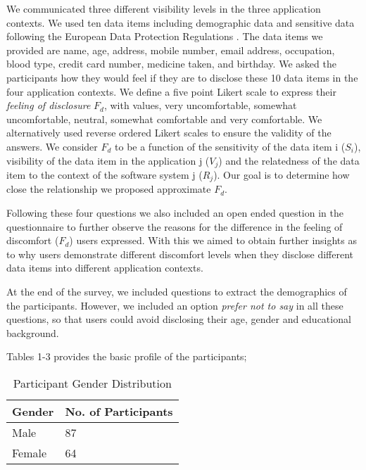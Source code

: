 \documentclass[10pt]{article}
\begin{document}
We communicated three different visibility levels in the three application contexts. We used ten data items including demographic data and sensitive data following the European Data Protection Regulations \cite {wagner2016national}. The data items we provided are name, age, address, mobile number, email address, occupation, blood type, credit card number, medicine taken, and birthday. We asked the participants how they would feel if they are to disclose these 10 data items in the four application contexts. We define a five point Likert scale to express their \textit{feeling of disclosure} $F_d$, with values, very uncomfortable, somewhat uncomfortable, neutral, somewhat comfortable and very comfortable. We alternatively used reverse ordered Likert scales to ensure the validity of the answers. We consider $F_d$ to be a function of the sensitivity of the data item i ($S_i$), visibility of the data item in the application j ($V_j$) and the relatedness of the data item to the context of the software system j ($R_j$). Our goal is to determine how close the relationship we proposed approximate $F_d$.

Following these four questions we also included an open ended question in the questionnaire to further observe the reasons for the difference in the feeling of discomfort ($F_d$) users expressed. With this we aimed to obtain further insights as to why users demonstrate different discomfort levels when they disclose different data items into different application contexts. 

At the end of the survey, we included questions to extract the demographics of the participants. However, we included an option \textit{prefer not to say} in all these questions, so that users could avoid disclosing their age, gender and educational background.

Tables 1-3 provides the basic profile of the participants;

\begin{center}
\begin{table}[htbp]
\caption{Participant Gender Distribution}
\begin{center}
\begin{tabular}{|l|l|} 
\hline
Gender & No. of Participants \\
\hline
Male & 87 \\
\hline
Female & 64 \\
\hline
\end{tabular}
\end{center}
\end{table}
\end{center} 
\end{document}

